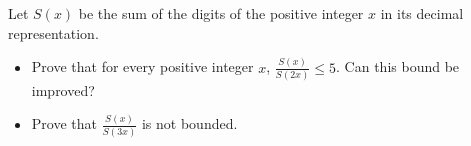 \begin{problem} [\cite{104NT}/ 3.2]

Let $S(x)$ be the sum of the digits of the positive integer $x$ in its decimal representation.
\begin{itemize}
    \item Prove that for every positive integer $x$, $\frac{S(x)}{S(2x)} \leq 5$. Can this bound be improved? 
    \item Prove that $\frac{S(x)}{S(3x)}$ is not bounded.
\end{itemize}
\label{[1]3.2}
\end{problem}

